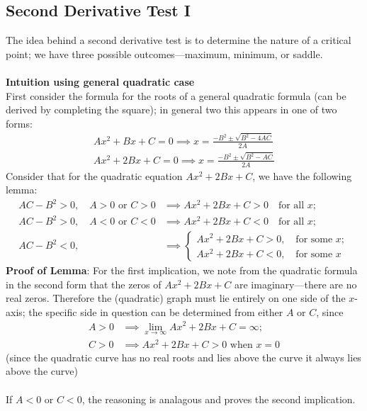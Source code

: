 \documentclass{report}
\begin{document}
\subsection{Second Derivative Test I}%
The idea behind a second derivative test is to determine the nature of a critical point; we have three
possible outcomes---maximum, minimum, or saddle.\\
\vspace{1mm}\\
\textbf{Intuition using general quadratic case}\\
First consider the formula for the roots of a general quadratic formula (can be derived by completing the square);
in general two this appears in one of two forms:
\begin{align*}
Ax^2+Bx+C=0\implies x=\frac{-B^2\pm\sqrt{B^2-4AC}}{2A}\\
Ax^2+2Bx+C=0\implies x=\frac{-B^2\pm\sqrt{B^2-AC}}{2A}
\end{align*}
Consider that for the quadratic equation $Ax^2+2Bx+C$, we have the following lemma:
\begin{align*}
AC-B^2>0,\quad A>0\text{ or }C>0&\implies Ax^2+2Bx+C>0
\quad\text{for all }x;\\
AC-B^2>0,\quad A<0\text{ or }C<0&\implies Ax^2+2Bx+C<0
\quad\text{for all }x;\\
AC-B^2<0,\quad&\implies\begin{cases}
Ax^2+2Bx+C>0,\quad\text{for some }x;\\
Ax^2+2Bx+C<0,\quad\text{for some }x
\end{cases}
\end{align*}
\textbf{Proof of Lemma}: For the first implication, we note from the quadratic formula in the second form that
the zeros of $Ax^2+2Bx+C$ are imaginary---there are no real zeros. Therefore the (quadratic) graph must lie entirely
on one side of the $x$-axis; the specific side in question can be determined from either $A$ or $C$, since
\begin{align*}
A>0&\implies\lim_{x\to\infty}Ax^2+2Bx+C=\infty;\\
C>0&\implies Ax^2+2Bx+C>0\text{ when }x=0
\end{align*}
(since the quadratic curve has no real roots and lies above the curve it always lies above the curve)\\
\vspace{1mm}\\
If $A<0$ or $C<0$, the reasoning is analagous and proves the second implication.\\
\end{document}
